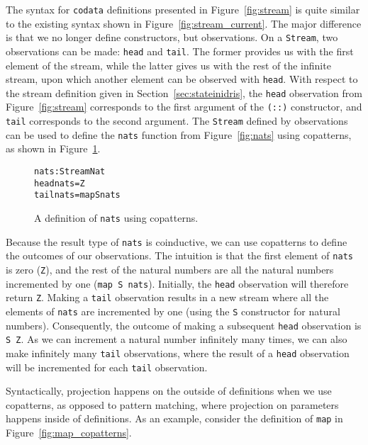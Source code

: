 The syntax for \texttt{codata} definitions presented in Figure~\ref{fig:stream} is quite similar to the existing syntax shown in Figure~\ref{fig:stream_current}. The major difference is that we no longer define constructors, but observations. On a \texttt{Stream}, two observations can be made: \texttt{head} and \texttt{tail}. The former provides us with the first element of the stream, while the latter gives us with the rest of the infinite stream, upon which another element can be observed with \texttt{head}. With respect to the stream definition given in Section~\ref{sec:stateinidris}, the \texttt{head} observation from Figure~\ref{fig:stream} corresponds to the first argument of the \texttt{(::)} constructor, and \texttt{tail} corresponds to the second argument. The \texttt{Stream} defined by observations can be used to define the \texttt{nats} function from Figure~\ref{fig:nats} using copatterns, as shown in Figure~\ref{fig:nats_copatterns}.

\begin{figure}
\begin{alltt}
nats : Stream Nat
head nats = Z
tail nats = map S nats
\end{alltt}
\caption{A definition of \texttt{nats} using copatterns.}
\label{fig:nats_copatterns}
\end{figure}

Because the result type of \texttt{nats} is coinductive, we can use copatterns to define the outcomes of our observations. The intuition is that the first element of \texttt{nats} is zero (\texttt{Z}), and the rest of the natural numbers are all the natural numbers incremented by one (\texttt{map S nats}). Initially, the \texttt{head} observation will therefore return \texttt{Z}. Making a \texttt{tail} observation results in a new stream where all the elements of \texttt{nats} are incremented by one (using the \texttt{S} constructor for natural numbers). Consequently, the outcome of making a subsequent \texttt{head} observation is \texttt{S Z}. As we can increment a natural number infinitely many times, we can also make infinitely many \texttt{tail} observations, where the result of a \texttt{head} observation will be incremented for each \texttt{tail} observation. 

Syntactically, projection happens on the outside of definitions when we use copatterns, as opposed to pattern matching, where projection on parameters happens inside of definitions. As an example, consider the definition of \texttt{map} in Figure~\ref{fig:map_copatterns}.


